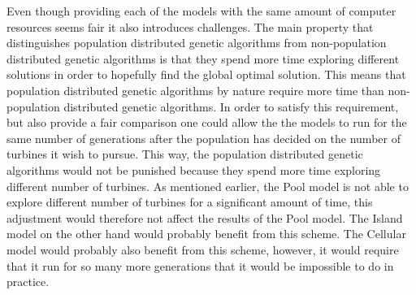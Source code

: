\noindent Even though providing each of the models with the same amount of computer resources seems fair it also introduces challenges. The main property that distinguishes population distributed genetic algorithms from non-population distributed genetic algorithms is that they spend more time exploring different solutions in order to hopefully find the global optimal solution. This means that population distributed genetic algorithms by nature require more time than non-population distributed genetic algorithms. In order to satisfy this requirement, but also provide a fair comparison one could allow the the models to run for the same number of generations after the population has decided on the number of turbines it wish to pursue. This way, the population distributed genetic algorithms would not be punished because they spend more time exploring different number of turbines. As mentioned earlier, the Pool model is not able to explore different number of turbines for a significant amount of time, this adjustment would therefore not affect the results of the Pool model. The Island model on the other hand would probably benefit from this scheme. The Cellular model would probably also benefit from this scheme, however, it would require that it run for so many more generations that it would be impossible to do in practice.\\


